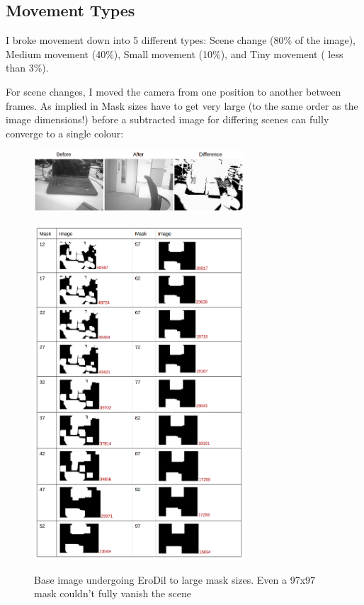 \documentclass[11pt]{article} %
\begin{document}
{{\subsection{Movement Types}
I broke movement down into 5 different types:  Scene change (80\% of the image), Medium movement (40\%), Small movement (10\%), and Tiny movement ( less than 3\%).

For scene changes, I moved the camera from one position to another between frames. As implied in Mask sizes have to get very large (to the same order as the image dimensions!) before a subtracted image for differing scenes can  fully converge to a single colour:

\begin{figure}[H]
        \vspace{-20pt}
        \begin{center}
                \includegraphics[width=0.7\textwidth]{../images/ImageOps/Diff1}
                \label{img:diff1}
        \end{center}
        \vspace{-20pt}
        \begin{center}
                \includegraphics[width=0.7\textwidth]{../images/ImageOps/Diff2}
                \label{img:diff2}
        \end{center}
        \vspace{-20pt}
        \caption{Base image undergoing EroDil to large mask sizes. Even a 97x97 mask couldn’t fully vanish the scene}
	\vspace{-40pt}
\end{figure}

}}
\end{document}

